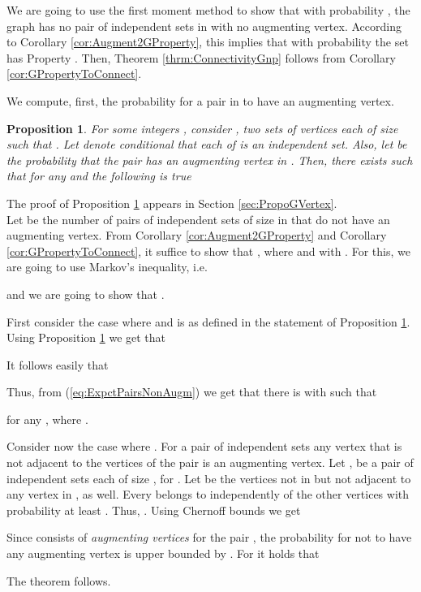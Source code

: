 \documentclass[a4paper,10pt]{article}
\makeatletter
\newtheorem{proposition}{Proposition}\renewcommand{\theproposition}{\arabic{proposition}}
\newenvironment{theoremproof}[1]{\noindent{\bf Proof of Theorem #1\@:}}{\hfill \\}
\makeatother
\begin{document}
We are going to use the first moment method to show that with
probability , the graph  has no pair of
independent sets in  with no augmenting
vertex. According to Corollary \ref{cor:Augment2GProperty}, this
implies that with probability  the set  has Property . Then, Theorem
\ref{thrm:ConnectivityGnp} follows from Corollary \ref{cor:GPropertyToConnect}.



We compute, first,  the probability for a pair in 
to have an augmenting vertex.


\begin{proposition}\label{lemma:PropertyGVertex}
For some integers , consider , two sets of
vertices each of size  such that . Let
 denote  conditional that each of
 is an independent set. Also, let   be
the probability that the pair  has an {\em augmenting
vertex} in . Then, there exists 
such that for any  and
 the following is true

\end{proposition}
The proof of Proposition \ref{lemma:PropertyGVertex} appears in 
Section \ref{sec:PropoGVertex}.\\



\begin{theoremproof}{\ref{thrm:ConnectivityGnp}}
Let  be the number of pairs of independent sets of size 
in   that do not have an augmenting vertex. From Corollary
\ref{cor:Augment2GProperty} and Corollary \ref{cor:GPropertyToConnect},
it suffice to show that ,
where  and  with .
For this, we are going to use Markov's inequality, i.e.

and we are going to show that .


First consider the case where 
and  is as defined in the statement of Proposition \ref{lemma:PropertyGVertex}.
Using Proposition \ref{lemma:PropertyGVertex} we get that 

It follows easily that

Thus, from (\ref{eq:ExpctPairsNonAugm}) we get that there is 
 with  such that 

for any , where .

Consider now the case where . For a pair of independent
sets any vertex that is not adjacent to the vertices of the pair is an
augmenting vertex. Let ,  be a pair of independent sets
each of size , for . 
Let  be the vertices not in  but 
not adjacent to any vertex in , as well.
Every   belongs to  independently of the
other vertices with probability at least  .
Thus, . Using Chernoff bounds 
we get

Since  consists of {\em augmenting vertices} for
the pair , the probability for  not to 
have any  augmenting vertex is upper bounded by .
For   it holds that

The theorem follows.
\end{theoremproof}
\end{document}
